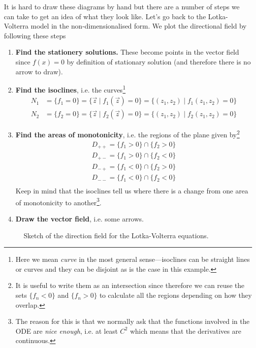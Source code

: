 It is hard to draw these diagrams by hand but there are a number of steps we
can take to get an idea of what they look like. Let's go back to the
Lotka-Volterra model in the non-dimensionalised form. We plot the directional
field by following these steps

\begin{enumerate}
  \item \textbf{Find the stationery solutions.} These become points in the vector field
    since $f(x) = 0$ by definition of stationary solution (and therefore there
    is no arrow to draw).
  \item \textbf{Find the isoclines}, i.e. the curves\footnote{Here we mean
    \textit{curve} in the most general sense---isoclines can be straight lines
  or curves and they can be disjoint as is the case in this example.}
    \begin{align*}
      N_1 &= \{f_1 = 0 \} = \{\vec{z} \mid f_1(\vec{z}) = 0\} = \{(z_1, z_2) \mid f_1(z_1,z_2) = 0\} \\
      N_2 &= \{f_2 = 0 \} = \{\vec{z} \mid f_2(\vec{z}) = 0\} = \{(z_1, z_2) \mid f_2(z_1,z_2) = 0\}
    \end{align*}
  \item \textbf{Find the areas of monotonicity}, i.e. the regions of the plane given
    by\footnote{It is useful to write them as an intersection since therefore
      we can reuse the sets $\{f_n < 0\}$ and $\{f_n > 0\}$ to calculate all
    the regions depending on how they overlap.}
    \begin{align*}
      D_{++} = \{f_1 > 0\} \cap \{f_2 > 0\} \\
      D_{+-} = \{f_1 > 0\} \cap \{f_2 < 0\} \\
      D_{-+} = \{f_1 < 0\} \cap \{f_2 > 0\} \\
      D_{--} = \{f_1 < 0\} \cap \{f_2 < 0\} \\
    \end{align*}
    Keep in mind that the isoclines tell us where there is a change from one
    area of monotonicity to another\footnote{The reason for this is that we
      normally ask that the functions involved in the ODE are \textit{nice
      enough}, i.e. at least $C^2$ which means that the derivatives are
    continuous.}.
  \item \textbf{Draw the vector field}, i.e. some arrows.
\end{enumerate}

\begin{figure}
  [h]
  \centering

  \caption{Sketch of the direction field for the Lotka-Volterra equations.}
\end{figure}

